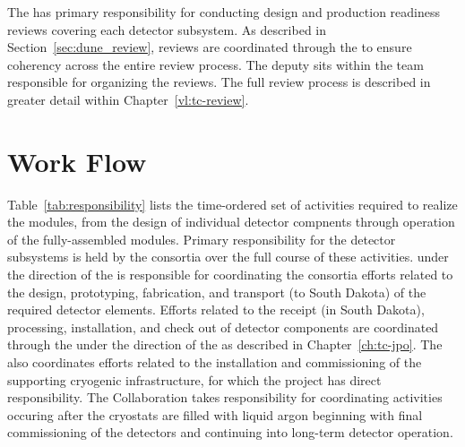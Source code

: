The  has primary responsibility for conducting design
and production readiness reviews covering each detector subsystem.
As described in Section~\ref{sec:dune_review}, reviews are coordinated
through the  to ensure coherency across the entire review
process.  The deputy  sits within the  team
responsible for organizing the reviews.  The full review process is
described in greater detail within Chapter~\ref{vl:tc-review}.

\section{ Work Flow}
\label{sec:workflow}

Table~\ref{tab:responsibility} lists the time-ordered set of activities 
required to realize the   modules, from the design 
of individual detector compnents through operation of the fully-assembled 
modules.  Primary responsibility for the detector subsystems is held 
by the  consortia over the full course of these activities.
  under the direction of the  is 
responsible for coordinating the consortia efforts related to the design, 
prototyping, fabrication, and transport (to South Dakota) of the required 
detector elements.  Efforts related to the receipt (in South Dakota), 
processing, installation, and check out of detector components are coordinated 
through the  under the direction of the  as 
described in Chapter~\ref{ch:tc-jpo}.  The  also coordinates 
efforts related to the installation and commissioning of the supporting
cryogenic infrastructure, for which the  project has direct 
responsibility.  The  Collaboration takes responsibility 
for coordinating activities occuring after the cryostats are filled 
with liquid argon beginning with final commissioning of the detectors 
and continuing into long-term detector operation.
